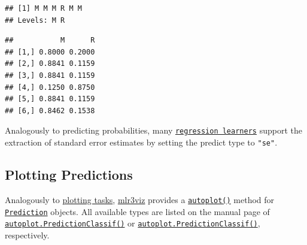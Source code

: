 \documentclass[]{scrbook}
\newenvironment{Shaded}{\begin{snugshade}}{\end{snugshade}}
\newcommand{\CommentTok}[1]{\textcolor[rgb]{0.56,0.35,0.01}{\textit{#1}}}
\newcommand{\DataTypeTok}[1]{\textcolor[rgb]{0.13,0.29,0.53}{#1}}
\newcommand{\KeywordTok}[1]{\textcolor[rgb]{0.13,0.29,0.53}{\textbf{#1}}}
\newcommand{\NormalTok}[1]{#1}
\newcommand{\OperatorTok}[1]{\textcolor[rgb]{0.81,0.36,0.00}{\textbf{#1}}}
\newcommand{\StringTok}[1]{\textcolor[rgb]{0.31,0.60,0.02}{#1}}
\renewenvironment{Shaded} {\begin{snugshade}\small} {\end{snugshade}}
\begin{document}
\begin{verbatim}
## [1] M M M R M M
## Levels: M R
\end{verbatim}

\begin{Shaded}
\end{Shaded}

\begin{verbatim}
##           M      R
## [1,] 0.8000 0.2000
## [2,] 0.8841 0.1159
## [3,] 0.8841 0.1159
## [4,] 0.1250 0.8750
## [5,] 0.8841 0.1159
## [6,] 0.8462 0.1538
\end{verbatim}

Analogously to predicting probabilities, many \href{https://mlr3.mlr-org.com/reference/LearnerRegr.html}{\texttt{regression\ learners}} support the extraction of standard error estimates by setting the predict type to \texttt{"se"}.

\hypertarget{autoplot-prediction}{%
\subsection{Plotting Predictions}\label{autoplot-prediction}}

Analogously to \protect\hyperlink{autoplot-task}{plotting tasks}, \href{https://mlr3viz.mlr-org.com}{mlr3viz} provides a \href{https://www.rdocumentation.org/packages/ggplot2/topics/autoplot}{\texttt{autoplot()}} method for \href{https://mlr3.mlr-org.com/reference/Prediction.html}{\texttt{Prediction}} objects.
All available types are listed on the manual page of \href{https://mlr3viz.mlr-org.com/reference/autoplot.PredictionClassif.html}{\texttt{autoplot.PredictionClassif()}} or \href{https://mlr3viz.mlr-org.com/reference/autoplot.PredictionClassif.html}{\texttt{autoplot.PredictionClassif()}}, respectively.

\begin{Shaded}
\end{Shaded}
\end{document}
